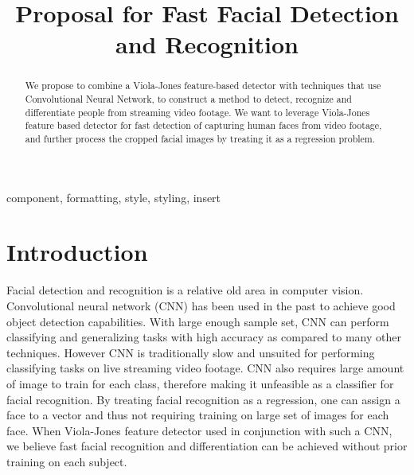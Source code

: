 \documentclass[conference]{IEEEtran}
\begin{document}
\title{Proposal for Fast Facial Detection and Recognition \\
}

\author{
\and
{}
\and
{}

}

\maketitle

\begin{abstract}

We propose to combine a Viola-Jones feature-based detector with techniques that use Convolutional Neural Network, to construct a method to detect, recognize and differentiate people from streaming video footage. We want to leverage Viola-Jones feature based detector for fast detection of capturing human faces from video footage, and further process the cropped facial images by treating it as a regression problem.

\end{abstract}

\begin{IEEEkeywords}
component, formatting, style, styling, insert
\end{IEEEkeywords}

\section{Introduction}

Facial detection and recognition is a relative old area in computer vision. Convolutional neural network (CNN) has been used in the past to achieve good object detection capabilities. With large enough sample set, CNN can perform classifying and generalizing tasks with high accuracy as compared to many other techniques. However CNN is traditionally slow and unsuited for performing classifying tasks on live streaming video footage. CNN also requires large amount of image to train for each class, therefore making it unfeasible as a classifier for facial recognition. By treating facial recognition as a regression, one can assign a face to a vector and thus not requiring training on large set of images for each face. When Viola-Jones feature detector used in conjunction with such a CNN, we believe fast facial recognition and differentiation can be achieved without prior training on each subject.
\end{document}
